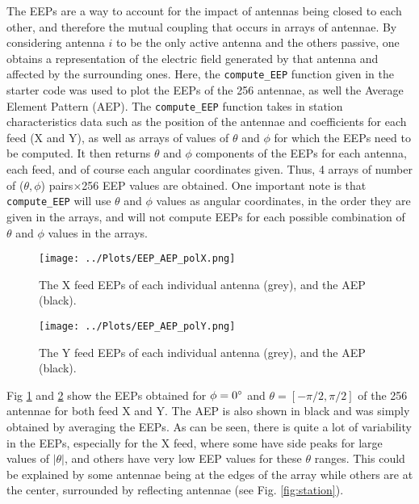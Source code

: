 \documentclass[12pt]{report} %
\begin{document}
The EEPs are a way to account for the impact of antennas being closed to each other, and therefore the mutual coupling that occurs in arrays of antennae\cite{borg2020on-sky}\cite{antenna_theory}. By considering antenna $i$ to be the only active antenna and the others passive, one obtains a representation of the electric field generated by that antenna and affected by the surrounding ones. Here, the \texttt{compute\_EEP} function given in the starter code was used to plot the EEPs of the 256 antennae, as well the Average Element Pattern (AEP). The \texttt{compute\_EEP} function takes in station characteristics data such as the position of the antennae and coefficients for each feed (X and Y), as well as arrays of values of $\theta$ and $\phi$ for which the EEPs need to be computed. It then returns $\theta$ and $\phi$ components of the EEPs for each antenna, each feed, and of course each angular coordinates given. Thus, 4 arrays of number of ($\theta,\phi$) pairs$\times$256 EEP values are obtained. One important note is that \texttt{compute\_EEP} will use $\theta$ and $\phi$ values as angular coordinates, in the order they are given in the arrays, and will not compute EEPs for each possible combination of $\theta$ and $\phi$ values in the arrays.

\begin{figure}[h]
    \centering
    \texttt{[image: ../Plots/EEP\_AEP\_polX.png]}
    \caption{The X feed EEPs of each individual antenna (grey), and the AEP (black).}
    \label{fig:EEPs1}
\end{figure}

\begin{figure}[h]
    \centering
    \texttt{[image: ../Plots/EEP\_AEP\_polY.png]}
    \caption{The Y feed EEPs of each individual antenna (grey), and the AEP (black).}
    \label{fig:EEPs2}
\end{figure}


Fig \ref*{fig:EEPs1} and \ref{fig:EEPs2} show the EEPs obtained for $\phi = 0\degree$ and $\theta = [-\pi/2, \pi/2]$ of the 256 antennae for both feed X and Y. The AEP is also shown in black and was simply obtained by averaging the EEPs. As can be seen, there is quite a lot of variability in the EEPs, especially for the X feed, where some have side peaks for large values of $|\theta|$, and others have very low EEP values for these $\theta$ ranges. This could be explained by some antennae being at the edges of the array while others are at the center, surrounded by reflecting antennae (see Fig. \ref{fig:station}).
\end{document}
